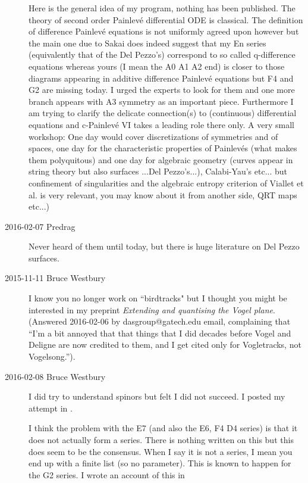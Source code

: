 \begin{description}
Here is the general idea of my program, nothing has been published.
The theory of second order Painlev\'e differential ODE is classical. The
definition of difference Painlev\'e equations is not uniformly agreed upon
however but the main one due to Sakai does indeed suggest that my En
series (equivalently that of the Del Pezzo's) correspond to so called
q-difference equations whereas yours (I mean the A0 A1 A2 end) is closer to
those diagrams appearing in additive difference Painlev\'e equations but F4
and G2 are missing today. I urged the experts to look for them and one more
branch appears with A3 symmetry as an important piece. Furthermore I am
trying to clarify  the delicate connection(s) to (continuous) differential
equations and c-Painlev\'e VI takes a leading role there only.
A very small workshop: One day would cover discretizations of
symmetries and of spaces, one day for the characteristic properties of
Painlev\'es (what makes them polyquitous) and one day for algebraic geometry
(curves appear in string theory but also surfaces ...Del Pezzo's...),
Calabi-Yau's etc... but confinement of singularities and the algebraic
entropy criterion of Viallet et al. is very relevant, you may know about
it from another side, QRT maps etc...)

\item[2016-02-07  Predrag]
Never heard of them until today, but there is huge literature on
 {Del Pezzo
surfaces}.


\item[2015-11-11 Bruce Westbury]
I know you no longer work on ``birdtracks" but I thought you might be
interested in my preprint {\em Extending and quantising
the Vogel plane}. \\
(Answered 2016-02-06 by dasgroup@gatech.edu email,
complaining that ``I'm a bit annoyed that that things that I did decades
before Vogel and Deligne are now credited to them, and I get cited only
for Vogletracks, not Vogelsong.'').

\item[2016-02-08 Bruce Westbury]
I did try to understand spinors but felt I did not succeed. I posted my
attempt in .

I think the problem with the E7 (and also the E6, F4 D4 series) is that
it does not actually form a series. There is nothing written on this but
this does seem to be the consensus. When I say it is not a series, I
mean you end up with a finite list (so no parameter). This is known to
happen for the G2 series. I wrote an account of this in


\end{description}

